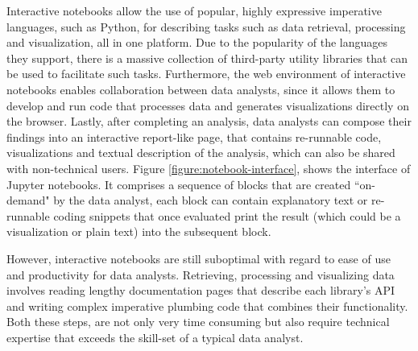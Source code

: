 Interactive notebooks allow the use of popular, highly expressive imperative languages, such as Python, for describing tasks such as data retrieval, processing and visualization, all in one platform. Due to the popularity of the languages they support, there is a massive collection of third-party utility libraries that can be used to facilitate such tasks. Furthermore, the web environment of interactive notebooks enables collaboration between data analysts, since it allows them to develop and run code that processes data and generates visualizations directly on the browser. Lastly, after completing an analysis, data analysts can compose their findings into an interactive report-like page, that contains re-runnable code, visualizations and textual description of the analysis, which can also be shared with non-technical users. Figure \ref{figure:notebook-interface}, shows the interface of Jupyter notebooks. It comprises a sequence of blocks that are created ``on-demand" by the data analyst, each block can contain explanatory text or re-runnable coding snippets that once evaluated print the result (which could be a visualization or plain text) into the subsequent block. 



However, interactive notebooks are still suboptimal with regard to ease of use and productivity for data analysts. Retrieving, processing and visualizing data involves reading lengthy documentation pages that describe each library's API and writing complex imperative plumbing code that combines their functionality. Both these steps, are not only very time consuming but also require technical expertise that exceeds the skill-set of a typical data analyst. 



